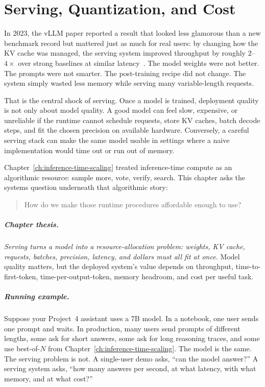 \chapter{Serving, Quantization, and Cost}
\label{ch:serving-quantization-cost}
\raggedbottom

In 2023, the vLLM paper reported a result that looked less glamorous than a new benchmark record but mattered just as much for real users: by changing how the KV cache was managed, the serving system improved throughput by roughly $2$--$4\times$ over strong baselines at similar latency~\cite{kwon2023pagedattention}. The model weights were not better. The prompts were not smarter. The post-training recipe did not change. The system simply wasted less memory while serving many variable-length requests.

That is the central shock of serving. Once a model is trained, deployment quality is not only about model quality. A good model can feel slow, expensive, or unreliable if the runtime cannot schedule requests, store KV caches, batch decode steps, and fit the chosen precision on available hardware. Conversely, a careful serving stack can make the same model usable in settings where a naive implementation would time out or run out of memory.

Chapter~\ref{ch:inference-time-scaling} treated inference-time compute as an algorithmic resource: sample more, vote, verify, search. This chapter asks the systems question underneath that algorithmic story:

\begin{quote}
How do we make those runtime procedures affordable enough to use?
\end{quote}

\paragraph{Chapter thesis.} \emph{Serving turns a model into a resource-allocation problem: weights, KV cache, requests, batches, precision, latency, and dollars must all fit at once.} Model quality matters, but the deployed system's value depends on throughput, time-to-first-token, time-per-output-token, memory headroom, and cost per useful task.

\paragraph{Running example.} Suppose your Project~4 assistant uses a 7B model. In a notebook, one user sends one prompt and waits. In production, many users send prompts of different lengths, some ask for short answers, some ask for long reasoning traces, and some use best-of-$N$ from Chapter~\ref{ch:inference-time-scaling}. The model is the same. The serving problem is not. A single-user demo asks, ``can the model answer?'' A serving system asks, ``how many answers per second, at what latency, with what memory, and at what cost?''

